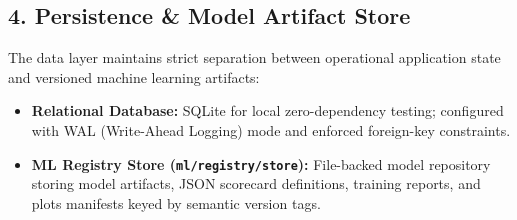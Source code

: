 \subsection{4. Persistence \& Model Artifact Store}
The data layer maintains strict separation between operational application state and versioned machine learning artifacts:
\begin{itemize}
  \item \textbf{Relational Database:} SQLite for local zero-dependency testing; configured with WAL (Write-Ahead Logging) mode and enforced foreign-key constraints.
  \item \textbf{ML Registry Store (\texttt{ml/registry/store}):} File-backed model repository storing model artifacts, JSON scorecard definitions, training reports, and plots manifests keyed by semantic version tags.
\end{itemize}
